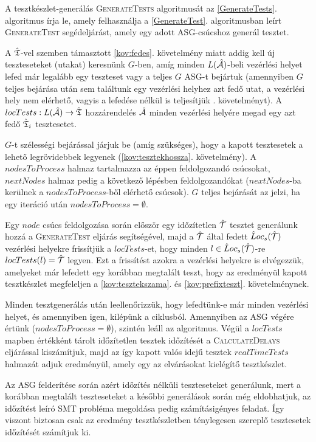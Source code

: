 A tesztkészlet-generálás \textsc{GenerateTests} algoritmusát az \ref{GenerateTests}. algoritmus írja le, amely felhasználja a \ref{GenerateTest}. algoritmusban leírt \textsc{GenerateTest} segédeljárást, amely egy adott ASG-csúcshoz generál tesztet.

A $\hat{\mathfrak{T}}$-vel szemben támasztott \ref{kov:fedes}. követelmény miatt addig kell új teszteseteket (utakat) keresnünk $G$-ben, amíg minden $L(\hat{\mathcal{A}})$-beli vezérlési helyet lefed már legalább egy teszteset vagy a teljes $G$ ASG-t bejártuk (amennyiben $G$ teljes bejárása után sem találtunk egy vezérlési helyhez azt fedő utat, a vezérlési hely nem elérhető, vagyis a lefedése nélkül is teljesítjük . követelményt). A $locTests: L(\hat{\mathcal{A}}) \rightarrow \hat{\mathfrak{T}}$ hozzárendelés $\hat{\mathcal{A}}$ minden vezérlési helyére megad egy azt fedő $\hat{\mathfrak{T}}_i$ tesztesetet.

$G$-t szélességi bejárással járjuk be (amíg szükséges), hogy a kapott tesztesetek a lehető legrövidebbek legyenek (\ref{kov:tesztekhossza}. követelmény). A $nodesToProcess$ halmaz tartalmazza az éppen feldolgozandó csúcsokat, $nextNodes$ halmaz pedig a következő lépésben feldolgozandókat ($nextNodes$-ba kerülnek a $nodesToProcess$-ből elérhető csúcsok). $G$ teljes bejárását az jelzi, ha egy iteráció után $nodesToProcess = \emptyset$.

Egy $node$ csúcs feldolgozása során először egy időzítetlen $\hat{\mathcal{T}}$ tesztet generálunk hozzá a \textsc{GenerateTest} eljárás segítségével, majd a $\hat{\mathcal{T}}$ által fedett $\hat{L}oc_s(\hat{\mathcal{T}})$ vezérlési helyekre frissítjük a $locTests$-et, hogy minden $l \in \hat{L}oc_s(\hat{\mathcal{T}})$-re $locTests(l) = \hat{\mathcal{T}}$ legyen. Ezt a frissítést azokra a vezérlési helyekre is elvégezzük, amelyeket már lefedett egy korábban megtalált teszt, hogy az eredményül kapott tesztkészlet megfeleljen a \ref{kov:tesztekszama}. és \ref{kov:prefixteszt}. követelménynek.

Minden tesztgenerálás után leellenőrizzük, hogy lefedtünk-e már minden vezérlési helyet, és amennyiben igen, kilépünk a ciklusból. Amennyiben az ASG végére értünk ($nodesToProcess = \emptyset$), szintén leáll az algoritmus. Végül a $locTests$ mapben értékként tárolt időzítetlen tesztek időzítését a \textsc{CalculateDelays} eljárással kiszámítjuk, majd az így kapott valós idejű tesztek $realTimeTests$ halmazát adjuk eredményül, amely egy az elvárásokat kielégítő tesztkészlet.

Az ASG felderítése során azért időzítés nélküli teszteseteket generálunk, mert a korábban megtalált teszteseteket a későbbi generálások során még eldobhatjuk, az időzítést leíró SMT probléma megoldása pedig számításigényes feladat. Így viszont biztosan csak az eredmény tesztkészletben ténylegesen szereplő tesztesetek időzítését számítjuk ki.


